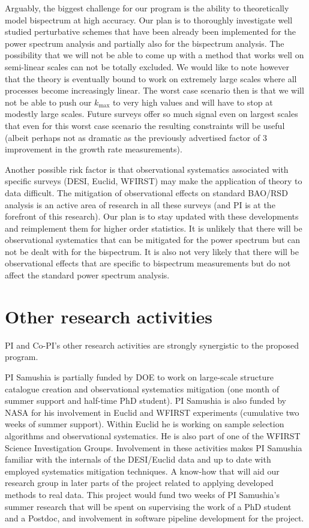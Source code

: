 Arguably, the biggest challenge for our program is the ability to theoretically
model bispectrum at high accuracy. Our plan is to thoroughly investigate well
studied perturbative schemes that have been already been implemented for the
power spectrum analysis and partially also for the bispectrum analysis. The
possibility that we will not be able to come up with a method that works well
on semi-linear scales can not be totally excluded. We would like to note
however that the theory is eventually bound to work on extremely large scales
where all processes become increasingly linear. The worst case scenario then is
that we will not be able to push our $k_\mathrm{max}$ to very high values and
will have to stop at modestly large scales. Future surveys offer so much
signal even on largest scales that even for this worst case scenario the
resulting constraints will be useful (albeit perhaps not as dramatic as the
previously advertised factor of 3 improvement in the growth rate measurements).

Another possible risk factor is that observational systematics associated with
specific surveys (DESI, Euclid, WFIRST) may make the application of theory to
data difficult. The mitigation of observational effects on standard BAO/RSD
analysis is an active area of research in all these surveys (and PI is at the
forefront of this research). Our plan is to stay updated with these
developments and reimplement them for higher order statistics. It is unlikely
that there will be observational systematics that can be mitigated for the
power spectrum but can not be dealt with for the bispectrum. It is also not
very likely that there will be observational effects that are specific to
bispectrum measurements but do not affect the standard power spectrum analysis.

\section{Other research activities}

PI and Co-PI's other research activities are strongly synergistic to the
proposed program.

PI Samushia is partially funded by DOE to work on large-scale structure
catalogue creation and observational systematics mitigation (one month of
summer support and half-time PhD student). PI Samushia is also funded by NASA
for his involvement in Euclid and WFIRST experiments (cumulative two weeks of
summer support). Within Euclid he is working on sample selection algorithms
and observational systematics. He is also part of one of the WFIRST Science
Investigation Groups. Involvement in these activities makes PI Samushia
familiar with  the internals of the DESI/Euclid data and up to date with
employed systematics mitigation techniques. A know-how that will aid our
research group in later parts of the project related to applying  developed
methods to real data. This project would fund two weeks of PI Samushia's
summer research that will be spent on supervising the work of a PhD student
and a Postdoc, and involvement in software pipeline development for the
project.

